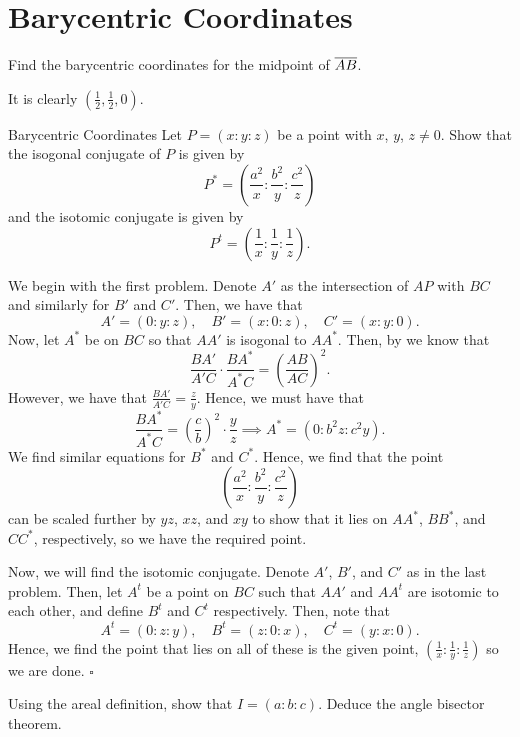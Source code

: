 \documentclass{article}
\begin{document}
\section{Barycentric Coordinates}

\begin{problem}[7.5]{}
Find the barycentric coordinates for the midpoint of $\overline{AB}$.
\end{problem}

It is clearly $\boxed{\left(\tfrac{1}{2}, \tfrac{1}{2}, 0\right)}$.

\begin{problem}[7.6]{Barycentric Coordinates}
Let $P = (x : y : z)$ be a point with $x$, $y$, $z \neq 0$. Show that the isogonal conjugate of $P$ is given by \[P^* =	\left(\dfrac{a^2}{x}:\dfrac{b^2}{y}:\dfrac{c^2}{z}\right)\] and the isotomic conjugate is given by \[P^t = \left(\dfrac{1}{x}:\dfrac{1}{y}:\dfrac{1}{z}\right).\]
\end{problem}

We begin with the first problem. Denote $A'$ as the intersection of $AP$ with $BC$ and similarly for $B'$ and $C'$. Then, we have that \[A' = (0 : y : z), \quad B' = (x : 0 : z), \quad C' = (x : y : 0).\] Now, let $A^*$ be on $BC$ so that $AA'$ is isogonal to $AA^*$. Then, by  we know that \[\dfrac{BA'}{A'C}\cdot \dfrac{BA^*}{A^*C} = \left(\dfrac{AB}{AC}\right)^2.\] However, we have that $\tfrac{BA'}{A'C} = \tfrac{z}{y}$. Hence, we must have that \[\dfrac{BA^*}{A^*C} = \left(\dfrac{c}{b}\right)^2\cdot \dfrac{y}{z} \implies A^* = \left(0: b^2z: c^2y\right).\] We find similar equations for $B^*$ and $C^*$. Hence, we find that the point \[\left(\dfrac{a^2}{x}:\dfrac{b^2}{y}:\dfrac{c^2}{z}\right)\] can be scaled further by $yz$, $xz$, and $xy$ to show that it lies on $AA^*$, $BB^*$, and $CC^*$, respectively, so we have the required point.

Now, we will find the isotomic conjugate. Denote $A'$, $B'$, and $C'$ as in the last problem. Then, let $A^t$ be a point on $BC$ such that $AA'$ and $AA^t$ are isotomic to each other, and define $B^t$ and $C^t$ respectively. Then, note that \[A^t = (0 : z : y), \quad B^t = (z : 0 : x), \quad C^t = (y : x : 0).\] Hence, we find the point that lies on all of these is the given point, $\left(\tfrac{1}{x}:\tfrac{1}{y}:\tfrac{1}{z}\right)$ so we are done. $\square$

\newpage

\begin{problem}[7.8]{}
Using the areal definition, show that $I = (a : b : c)$. Deduce the angle bisector theorem.
\end{problem}
\end{document}

